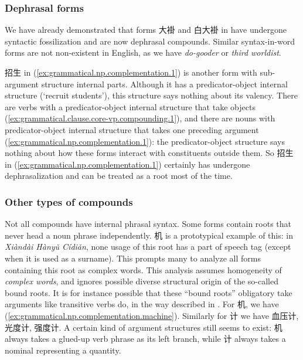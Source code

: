 \documentclass[UTF8, a4paper, oneside, scheme=plain, 12pt]{ctexrep}
\newcommand*{\term}[1]{\emph{#1}}
\newcommand{\form}[1]{\emph{#1}}
\newcommand{\work}[1]{\textit{#1}}
\newcommand{\translate}[1]{`#1'}
\begin{document}
\subsubsection{Dephrasal forms}

We have already demonstrated that forms 大褂 and 白大褂 in 
have undergone syntactic fossilization and are now dephrasal compounds.
Similar syntax-in-word forms are not non-existent in English,
as we have \form{do-gooder} or \form{third worldist}.

招生 in (\ref{ex:grammatical.np.complementation.1}) is another form with sub-argument structure internal parts.
Although it has a predicator-object internal structure (\translate{recruit students}),
this structure says nothing about its valency.
There are verbs with a predicator-object internal structure
that take objects (\ref{ex:grammatical.clause.core-vp.compounding.1}),
and there are nouns with predicator-object internal structure 
that takes one preceding argument (\ref{ex:grammatical.np.complementation.1}):
the predicator-object structure says nothing about how these forms
interact with constituents outside them.
So 招生 in (\ref{ex:grammatical.np.complementation.1})
certainly has undergone dephrasalization and
can be treated as a root most of the time.

\subsubsection{Other types of compounds}\label{sec:grammatical.np.derivation.compounding}

Not all compounds have internal phrasal syntax.
Some forms contain roots that never head a noun phrase independently.
机 is a prototypical example of this:
in \work{Xiàndài Hànyǔ Cídiǎn}, none usage of this root has a part of speech tag
(except when it is used as a surname).
This prompts many to analyze all forms containing this root as complex words.
This analysis assumes homogeneity of \term{complex words},
and ignores possible diverse structural origin of the so-called bound roots.
It is for instance possible that these ``bound roots'' 
obligatory take arguments like transitive verbs do,
in the way described in .
For 机, we have (\ref{ex:grammatical.np.complementation.machine}).
Similarly for 计 we have 血压计, 光度计, 强度计.
A certain kind of argument structures still seems to exist:
机 always takes a glued-up verb phrase as its left branch,
while 计 always takes a nominal representing a quantity.
\end{document}
